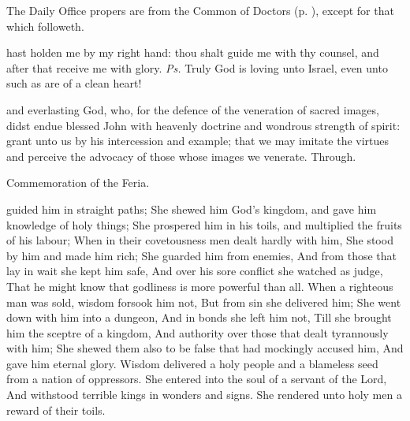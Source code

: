 \begin{rubric}
	The Daily Office propers are from the Common of Doctors (p. \pageref{CommonDoctors}), except for that which followeth.
\end{rubric}

\introit
{} hast holden me by my right hand: thou shalt guide me with thy counsel, and after that receive me with glory. \textit{Ps.} Truly God is loving unto Israel, even unto such as are of a clean heart!

\collect
{} and everlasting God, who, for the defence of the veneration of sacred images, didst endue blessed John with heavenly doctrine and wondrous strength of spirit: grant unto us by his intercession and example; that we may imitate the virtues and perceive the advocacy of those whose images we venerate. Through.

\begin{rubric}
	Commemoration of the Feria.
\end{rubric}

 guided him in straight paths; She shewed him God’s kingdom, and gave him knowledge of holy things; She prospered him in his toils, and multiplied the fruits of his labour; When in their covetousness men dealt hardly with him, She stood by him and made him rich; She guarded him from enemies, And from those that lay in wait she kept him safe, And over his sore conflict she watched as judge, That he might know that godliness is more powerful than all. When a righteous man was sold, wisdom forsook him not, But from sin she delivered him; She went down with him into a dungeon, And in bonds she left him not, Till she brought him the sceptre of a kingdom, And authority over those that dealt tyrannously with him; She shewed them also to be false that had mockingly accused him, And gave him eternal glory. Wisdom delivered a holy people and a blameless seed from a nation of oppressors. She entered into the soul of a servant of the Lord, And withstood terrible kings in wonders and signs. She rendered unto holy men a reward of their toils.


